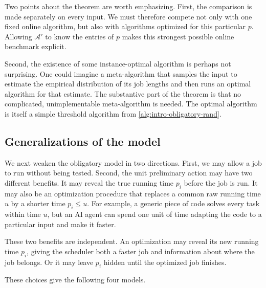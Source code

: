 Two points about the theorem are worth emphasizing.  First, the comparison
is made separately on every input.  We must therefore compete not only
with one fixed online algorithm, but also with algorithms optimized for this
particular $p$.  Allowing $\mathcal A'$ to know the entries of $p$ makes this
strongest possible online benchmark explicit.

Second, the existence of some instance-optimal algorithm is perhaps not
surprising.  One could imagine a meta-algorithm that samples the input to
estimate the empirical distribution of its job lengths and then runs an
optimal algorithm for that estimate.  The
substantive part of the theorem is that no complicated, unimplementable meta-algorithm is
needed.  The optimal algorithm is itself a simple
threshold algorithm from \cref{alg:intro-obligatory-rand}. 


\subsection{Generalizations of the model}
\label{sec:intro-optional-map}

We next weaken the obligatory model in two directions.  First, we may allow a
job to run without being tested.  Second, the unit preliminary action may have
two different benefits.  It may reveal the true running time $p_i$ before the
job is run.  It may also be an optimization procedure that replaces a common
raw running time $u$ by a shorter time $p_i\leq u$.  For example, a generic
piece of code solves every task within time $u$, but an AI agent can spend one
unit of time adapting the code to a particular input and make it faster.

These two benefits are independent.  An optimization may reveal its new
running time $p_i$, giving the scheduler both a faster job and information
about where the job belongs.  Or it may leave $p_i$ hidden until the optimized
job finishes.

These choices give the following four models.

